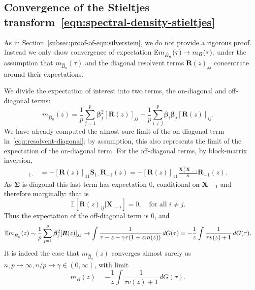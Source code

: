 \documentclass{article}
\newcommand{\bX}{\boldsymbol{X}}
\newcommand{\bbeta}{\boldsymbol{\beta}}
\newcommand{\bSigma}{\boldsymbol{\Sigma}}
\newcommand{\bS}{\boldsymbol{S}}
\newcommand{\bR}{\boldsymbol{R}}
\begin{document}
\subsection{Convergence of the Stieltjes transform~\eqref{eqn:spectral-density-stieltjes}}
\label{subsec:convergence-of-eqn:spectral-density-stieltjes}
As in Section~\ref{subsec:proof-of-eqn:silverstein}, we do not provide a rigorous proof. Instead we only show convergence of expectation $\mathbb{E} m_{\hat{B}_n}(\tau) \to m_{B}(\tau)$, under the assumption that $m_{\hat{B}_n}(\tau)$ and the diagonal resolvent terms $\bR(z)_{jj}$ concentrate around their expectations.

We divide the expectation of interest into two terms, the on-diagonal and off-diagonal terms:
\begin{equation*}
	m_{\hat{B}_n}(z) = \frac{1}{p} \sum_{j = 1}^{p} \bbeta_j^2 [\bR(z)]_{jj} + \frac{1}{p} \sum_{i \neq j}^{p} \bbeta_i \bbeta_j [\bR(z)]_{ij}.
\end{equation*}
We have already computed the almost sure limit of the on-diagonal term in~\eqref{eqn:resolvent-diagonal}; by assumption, this also represents the limit of the expectation of the on-diagonal term. For the off-diagonal terms, by block-matrix inversion,
\begin{align*}
	[\bR(z)]_{1\cdot} 
	& = -[\bR(z)]_{11} \bS_{1\cdot} \bR_{-1}(z)  = -[\bR(z)]_{11} \frac{\bX_{\cdot 1}^{\top} \bX_{\cdot -1}}{n} \bR_{-1}(z). 
\end{align*}
As $\bSigma$ is diagonal this last term has expectation $0$, conditional on $\bX_{\cdot -1}$ and therefore marginally: that is
\begin{equation}
	\label{eqn:off-diagonal-resolvent}
	\mathbb{E}[\bR(z)_{ij}|\bX_{\cdot-i}] = 0, \quad \textrm{for all $i \neq j$.}
\end{equation}
Thus the expectation of the off-diagonal term is $0$, and
\begin{equation*}
	\E m_{\hat{B}_n}(z) \sim \frac{1}{p}\sum_{j = 1}^{p} \bbeta_j^2 [\bR(z)]_{jj} \to \int \frac{1}{\tau - z - \gamma \tau(1 + z m(z))} \,dG(\tau) = -\frac{1}{z}\int\frac{1}{\tau v(z) + 1} \,dG(\tau).
\end{equation*}
It is indeed the case that $m_{\hat{B}_n}(z)$ converges almost surely as $n,p \to \infty, n/p \to \gamma \in (0,\infty)$, with limit
\begin{equation}
	\label{eqn:stieljtes-limiting-spectral-density}
	m_{B}(z) = -\frac{1}{z}\int\frac{1}{\tau v(z) + 1} \,dG(\tau).
\end{equation}
\end{document}

